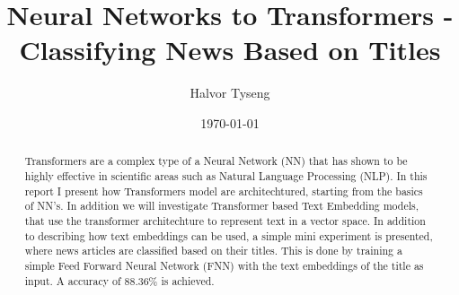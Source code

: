 \documentclass[english,notitlepage,reprint,nofootinbib]{revtex4-1}  %
\begin{document}
\title{Neural Networks to Transformers - Classifying News Based on Titles}  %
\author{Halvor Tyseng} %
\date{\today}                             %


\begin{abstract}
    Transformers are a complex type of a Neural Network (NN) that has shown 
    to be highly effective in scientific areas such as Natural Language Processing (NLP).
    In this report I present how Transformers model are architechtured, 
    starting from the basics of NN's.
    In addition we will investigate Transformer based Text Embedding models,
    that use the transformer architechture to represent text in a vector space.
    In addition to describing how text embeddings can be used, a simple
    mini experiment is presented, where news articles are classified based on their titles.
    This is done by training a simple Feed Forward Neural Network (FNN)
    with the text embeddings of the title as input. A accuracy of $88.36\%$ is achieved.
\end{abstract}
\maketitle














%



\onecolumngrid

\end{document}
